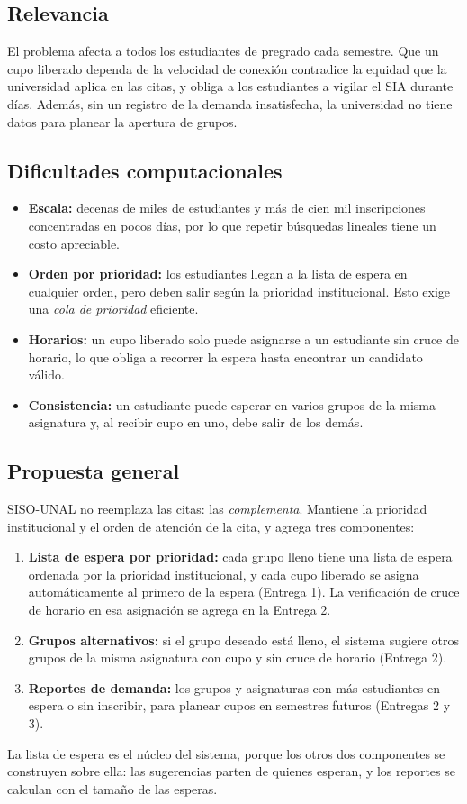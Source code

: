 \documentclass[conference]{IEEEtran}
\begin{document}
\subsection{Relevancia}
El problema afecta a todos los estudiantes de pregrado cada semestre. Que un cupo liberado dependa de la velocidad de conexión contradice la equidad que la universidad aplica en las citas, y obliga a los estudiantes a vigilar el SIA durante días. Además, sin un registro de la demanda insatisfecha, la universidad no tiene datos para planear la apertura de grupos.

\subsection{Dificultades computacionales}
\begin{itemize}
    \item \textbf{Escala:} decenas de miles de estudiantes y más de cien mil inscripciones concentradas en pocos días, por lo que repetir búsquedas lineales tiene un costo apreciable.
    \item \textbf{Orden por prioridad:} los estudiantes llegan a la lista de espera en cualquier orden, pero deben salir según la prioridad institucional. Esto exige una \emph{cola de prioridad} eficiente.
    \item \textbf{Horarios:} un cupo liberado solo puede asignarse a un estudiante sin cruce de horario, lo que obliga a recorrer la espera hasta encontrar un candidato válido.
    \item \textbf{Consistencia:} un estudiante puede esperar en varios grupos de la misma asignatura y, al recibir cupo en uno, debe salir de los demás.
\end{itemize}

\subsection{Propuesta general}
SISO-UNAL no reemplaza las citas: las \emph{complementa}. Mantiene la prioridad institucional y el orden de atención de la cita, y agrega tres componentes:
\begin{enumerate}
    \item \textbf{Lista de espera por prioridad:} cada grupo lleno tiene una lista de espera ordenada por la prioridad institucional, y cada cupo liberado se asigna automáticamente al primero de la espera (Entrega 1). La verificación de cruce de horario en esa asignación se agrega en la Entrega 2.
    \item \textbf{Grupos alternativos:} si el grupo deseado está lleno, el sistema sugiere otros grupos de la misma asignatura con cupo y sin cruce de horario (Entrega 2).
    \item \textbf{Reportes de demanda:} los grupos y asignaturas con más estudiantes en espera o sin inscribir, para planear cupos en semestres futuros (Entregas 2 y 3).
\end{enumerate}
La lista de espera es el núcleo del sistema, porque los otros dos componentes se construyen sobre ella: las sugerencias parten de quienes esperan, y los reportes se calculan con el tamaño de las esperas.
\end{document}
